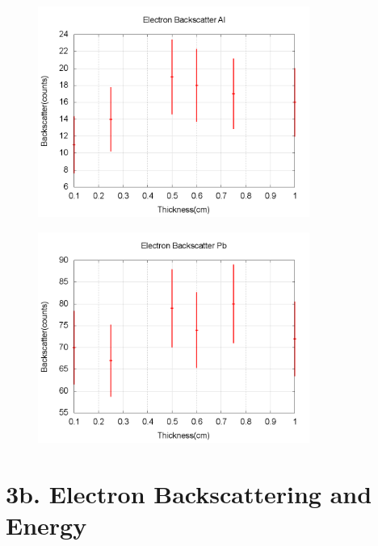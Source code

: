 \documentclass[aps,prl,twocolumn,superscriptaddress]{revtex4-1}
\begin{document}
\begin{figure}[h!]
  \begin{center}
\centerline{\includegraphics[width=3.5in]{scatteral.png}}
  \end{center}
\end{figure}
\begin{figure}[h!]
  \begin{center}
\centerline{\includegraphics[width=3.5in]{scatterpb.png}}
  \end{center}
\end{figure}

\section{3b. Electron Backscattering and Energy}
\end{document}
